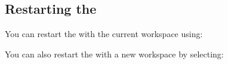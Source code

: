 \subsection{Restarting the \ite{}}
You can restart the \ite{} with the current workspace using:\\

You can also restart the \ite{} with a new workspace by selecting:\\





